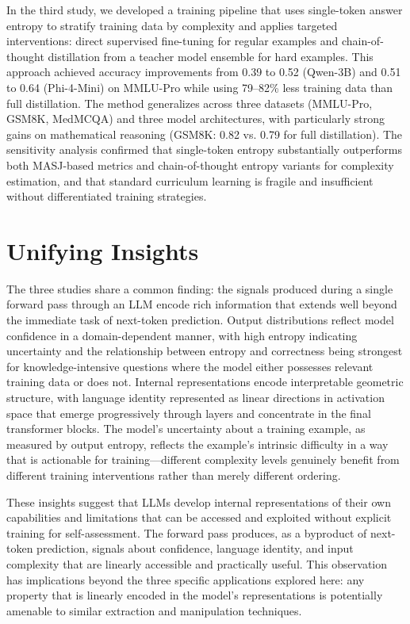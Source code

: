 In the third study, we developed a training pipeline that uses single-token answer entropy to stratify training data by complexity and applies targeted interventions: direct supervised fine-tuning for regular examples and chain-of-thought distillation from a teacher model ensemble for hard examples. This approach achieved accuracy improvements from 0.39 to 0.52 (Qwen-3B) and 0.51 to 0.64 (Phi-4-Mini) on MMLU-Pro while using 79--82\% less training data than full distillation. The method generalizes across three datasets (MMLU-Pro, GSM8K, MedMCQA) and three model architectures, with particularly strong gains on mathematical reasoning (GSM8K: 0.82 vs. 0.79 for full distillation). The sensitivity analysis confirmed that single-token entropy substantially outperforms both MASJ-based metrics and chain-of-thought entropy variants for complexity estimation, and that standard curriculum learning is fragile and insufficient without differentiated training strategies.

\section{Unifying Insights}

The three studies share a common finding: the signals produced during a single forward pass through an LLM encode rich information that extends well beyond the immediate task of next-token prediction. Output distributions reflect model confidence in a domain-dependent manner, with high entropy indicating uncertainty and the relationship between entropy and correctness being strongest for knowledge-intensive questions where the model either possesses relevant training data or does not. Internal representations encode interpretable geometric structure, with language identity represented as linear directions in activation space that emerge progressively through layers and concentrate in the final transformer blocks. The model's uncertainty about a training example, as measured by output entropy, reflects the example's intrinsic difficulty in a way that is actionable for training---different complexity levels genuinely benefit from different training interventions rather than merely different ordering.

These insights suggest that LLMs develop internal representations of their own capabilities and limitations that can be accessed and exploited without explicit training for self-assessment. The forward pass produces, as a byproduct of next-token prediction, signals about confidence, language identity, and input complexity that are linearly accessible and practically useful. This observation has implications beyond the three specific applications explored here: any property that is linearly encoded in the model's representations is potentially amenable to similar extraction and manipulation techniques.

